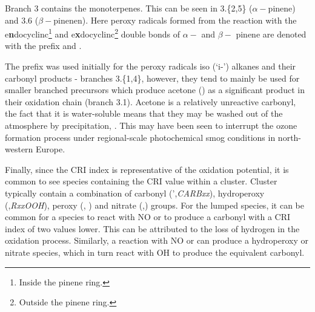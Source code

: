 Branch 3 contains the monoterpenes. This can be seen in 3.\{2,5\} ($\alpha-$pinene) and 3.6 ($\beta-$pinenen). Here peroxy radicals formed from the reaction with the e\textbf{n}docyclinc\footnote{Inside the pinene ring.} and e\textbf{x}docyclinc\footnote{Outside the pinene ring.} double bonds of $\alpha-$ and $\beta-$ pinene are denoted with the prefix \emph{} and \emph{}.

The \emph{} prefix was used initially for the peroxy radicals iso (`i-') alkanes and their carbonyl products - branches 3.\{1,4\}, however, they tend to mainly be used for smaller branched precursors which produce acetone () as a significant product in their oxidation chain (branch 3.1). Acetone is a relatively unreactive carbonyl, the fact that it is water-soluble means that they may be washed out of the atmosphere by precipitation, \citep{acetonerain}. This may have been seen to interrupt the ozone formation process under regional-scale photochemical smog conditions in north-western Europe.

Finally, since the CRI index is representative of the oxidation potential, it is common to see species containing the CRI value within a cluster. Cluster typically contain a combination of carbonyl (',\emph{CARBxx}), hydroperoxy (,\emph{RxxOOH}), peroxy (, \emph{}) and nitrate (,\emph{}) groups. For the lumped species, it can be common for a  species to react with NO or  to produce a carbonyl with a CRI index of two values lower. This can be attributed to the loss of hydrogen in the oxidation process. Similarly, a reaction with NO or  can produce a hydroperoxy or nitrate species, which in turn react with OH to produce the equivalent carbonyl.


%
%
%
%
%



